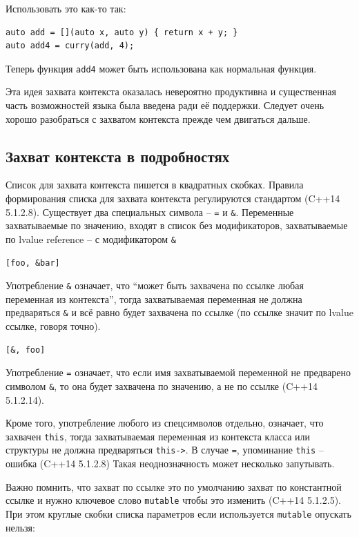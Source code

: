 \documentclass[a4paper,12pt,oneside]{book}
\begin{document}
Использовать это как-то так:

\begin{lstlisting}
auto add = [](auto x, auto y) { return x + y; }
auto add4 = curry(add, 4);
\end{lstlisting}

Теперь функция \lstinline!add4! может быть использована как нормальная функция.

Эта идея захвата контекста оказалась невероятно продуктивна и существенная часть возможностей языка была введена ради её поддержки. Следует очень хорошо разобраться с захватом контекста прежде чем двигаться дальше.

\subsection{Захват контекста в подробностях}\label{ContextCapture}

Список для захвата контекста пишется в квадратных скобках. Правила формирования списка для захвата контекста регулируются стандартом (C++14 5.1.2.8). Существует два специальных символа -- \lstinline!=! и \lstinline!&!. Переменные захватываемые по значению, входят в список без модификаторов, захватываемые по lvalue reference -- с модификатором \lstinline!&!

\begin{lstlisting}
[foo, &bar]
\end{lstlisting}

Употребление \lstinline!&! означает, что ``может быть захвачена по ссылке любая переменная из контекста'', тогда захватываемая переменная не должна предваряться \lstinline!&! и всё равно будет захвачена по ссылке (по ссылке значит по lvalue ссылке, говоря точно).

\begin{lstlisting}
[&, foo]
\end{lstlisting}

Употребление \lstinline!=! означает, что если имя захватываемой переменной не предварено символом \lstinline!&!, то она будет захвачена по значению, а не по ссылке (C++14 5.1.2.14). 

Кроме того, употребление любого из спецсимволов отдельно, означает, что захвачен \lstinline!this!, тогда захватываемая переменная из контекста класса или структуры не должна предваряться \lstinline!this->!. В случае \lstinline!=!, упоминание \lstinline!this! -- ошибка (C++14 5.1.2.8)  Такая неоднозначность может несколько запутывать.

Важно помнить, что захват по ссылке это по умолчанию захват по константной ссылке и нужно ключевое слово \lstinline!mutable! чтобы это изменить (C++14 5.1.2.5). При этом круглые скобки списка параметров если используется \lstinline!mutable! опускать нельзя:
\end{document}

